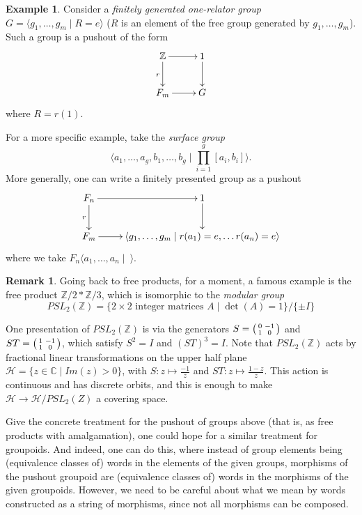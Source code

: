 \documentclass{tufte-handout}
\def\ZZ{\mathbb{Z}}
\def\CC{\mathbb{C}}
\theoremstyle{definition}
\newtheorem{example}{Example}
\newtheorem*{rem}{Remark}
\newenvironment{psmallmatrix}
  {\left(\begin{smallmatrix}}
  {\end{smallmatrix}\right)}
\begin{document}
\begin{example}\label{eg:one-relator_group}
Consider a \emph{finitely generated one-relator group} 
$G= \langle g_1,\ldots,g_m\mid R=e\rangle$ ($R$ is an element of the free group generated by $g_1,\ldots,g_m$). Such a group is a pushout of the form
\[
\xymatrix{
	\ZZ \ar[r] \ar[d]_r & 1 \ar[d] \\
	F_m \ar[r] & G
}
\]
where $R = r(1)$.
\end{example}

For a more specific example, take the \emph{surface group}
\[
\langle a_1,\ldots, a_g,b_1,\ldots,b_g\mid \prod_{i=1}^g [a_i,b_i] \rangle.
\]
More generally, one can write a finitely presented group as a pushout
\[
\xymatrix{
	F_n \ar[r] \ar[d]_r & 1 \ar[d] \\
	F_m \ar[r] & \langle g_1,\ldots,g_m\mid r(a_1)=e,\ldots r(a_n)=e\rangle
}
\]
where we take $F_n \langle a_1,\ldots,a_n\mid\ \rangle$.


\begin{rem}
Going back to free products, for a moment, a famous example is the free product $\ZZ/2\ast \ZZ/3$, which is isomorphic to the \emph{modular group} 
\[
	PSL_2(\ZZ) = \{2\times 2 \text{ integer matrices } A\mid \det(A) = 1\}/\{\pm I\}
\]

One presentation
 of $PSL_2(\ZZ)$ is via the generators $S=\begin{psmallmatrix}0&-1\\1&0 
\end{psmallmatrix}$ and $ST = \begin{psmallmatrix}1 &-1 \\1 &0 \end{psmallmatrix}$, 
which satisfy $S^2=I$ and $(ST)^3=I$. Note that $PSL_2(\ZZ)$ acts by fractional linear 
transformations on the upper half plane $\mathcal{H} = \{z\in \CC \mid Im(z) > 0\}$, 
with $S\colon z \mapsto \frac{-1}{z}$ and $ST\colon z\mapsto \frac{1-z}{z}$. This action 
is continuous and has discrete orbits, and this is enough to make $\mathcal{H} \to 
\mathcal{H}/PSL_2(Z)$ a covering space.
\end{rem}

Give the concrete treatment for the pushout of groups above (that is, as free products 
with amalgamation), one could hope for a similar treatment for groupoids. And indeed, 
one can do this, where instead of group elements being (equivalence classes of) words in 
the elements of the given groups, morphisms of the pushout groupoid are (equivalence 
classes of) words in the morphisms of the given groupoids. However, we need to be 
careful about what we mean by words constructed as a string of morphisms, since not all 
morphisms can be composed.
\end{document}
